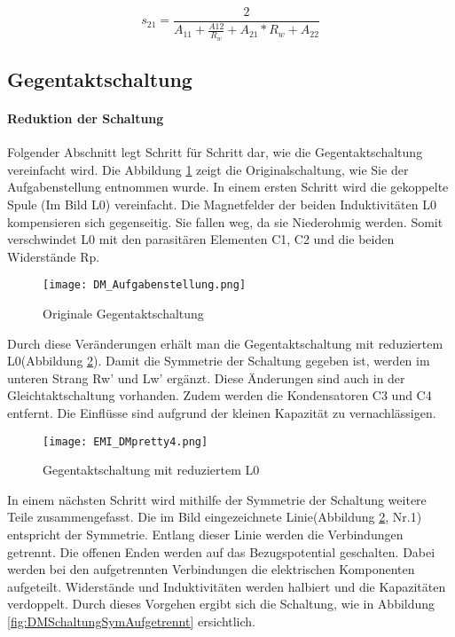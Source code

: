 \begin{equation}\label{equ:s21ausAMatrix}
s_{21} = \frac{2}{A_{11}+\frac{A{12}}{R_w}+A_{21}*R_w+A_{22}}
\end{equation}


\subsection{Gegentaktschaltung}\label{subsec:zusammenfassungGegentakt}
\paragraph{Reduktion der Schaltung}\label{para:redukGegentakt}
Folgender Abschnitt legt Schritt für Schritt dar, wie die Gegentaktschaltung vereinfacht wird. Die Abbildung \ref{fig:DMSchaltungAufgabenstellung} zeigt die Originalschaltung, wie Sie der Aufgabenstellung entnommen wurde. In einem ersten Schritt wird die gekoppelte Spule (Im Bild L0) vereinfacht. Die Magnetfelder der beiden Induktivitäten L0 kompensieren sich gegenseitig. Sie fallen weg, da sie Niederohmig werden. Somit verschwindet L0 mit den parasitären Elementen C1, C2 und die beiden Widerstände Rp.
\begin{figure}[H]
	\centering
	\texttt{[image: DM\_Aufgabenstellung.png]}
	\caption{Originale Gegentaktschaltung}
	\label{fig:DMSchaltungAufgabenstellung}
\end{figure}
Durch diese Veränderungen erhält man die Gegentaktschaltung mit reduziertem L0(Abbildung \ref{fig:DMSchaltungreduziertL0}). Damit die Symmetrie der Schaltung gegeben ist, werden im unteren Strang Rw’ und Lw’ ergänzt. Diese Änderungen sind auch in der Gleichtaktschaltung vorhanden. Zudem werden die Kondensatoren C3 und C4 entfernt. Die Einflüsse sind aufgrund der kleinen Kapazität zu vernachlässigen. 
\begin{figure}[H]
	\centering
	\texttt{[image: EMI\_DMpretty4.png]}
	\caption{Gegentaktschaltung mit reduziertem L0}
	\label{fig:DMSchaltungreduziertL0}
\end{figure}
In einem nächsten Schritt wird mithilfe der Symmetrie der Schaltung weitere Teile zusammengefasst. Die im Bild eingezeichnete Linie(Abbildung \ref{fig:DMSchaltungreduziertL0}, Nr.1) entspricht der Symmetrie. Entlang dieser Linie werden die Verbindungen getrennt. Die offenen Enden werden auf das Bezugspotential geschalten. Dabei werden bei den aufgetrennten Verbindungen die elektrischen Komponenten aufgeteilt. Widerstände und Induktivitäten werden halbiert und die Kapazitäten verdoppelt. Durch dieses Vorgehen ergibt sich die Schaltung, wie in Abbildung \ref{fig:DMSchaltungSymAufgetrennt} ersichtlich.
